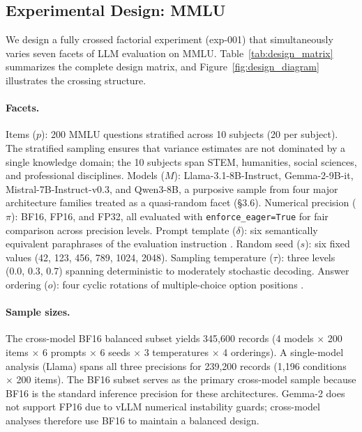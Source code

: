 \subsection{Experimental Design: MMLU}
\label{sec:exp001}

We design a fully crossed factorial experiment (exp-001) that simultaneously varies seven facets of LLM evaluation on MMLU. Table~\ref{tab:design_matrix} summarizes the complete design matrix, and Figure~\ref{fig:design_diagram} illustrates the crossing structure.

\paragraph{Facets.} Items ($p$): 200 MMLU questions stratified across 10 subjects (20 per subject). The stratified sampling ensures that variance estimates are not dominated by a single knowledge domain; the 10 subjects span STEM, humanities, social sciences, and professional disciplines. Models ($M$): Llama-3.1-8B-Instruct, Gemma-2-9B-it, Mistral-7B-Instruct-v0.3, and Qwen3-8B, a purposive sample from four major architecture families treated as a quasi-random facet (\S3.6). Numerical precision ($\pi$): BF16, FP16, and FP32, all evaluated with \texttt{enforce\_eager=True} for fair comparison across precision levels. Prompt template ($\delta$): six semantically equivalent paraphrases of the evaluation instruction \cite{sclar2024formatting}. Random seed ($s$): six fixed values (42, 123, 456, 789, 1024, 2048). Sampling temperature ($\tau$): three levels (0.0, 0.3, 0.7) spanning deterministic to moderately stochastic decoding. Answer ordering ($o$): four cyclic rotations of multiple-choice option positions \cite{pezeshkpour2024ordering}.

\paragraph{Sample sizes.} The cross-model BF16 balanced subset yields 345,600 records (4 models $\times$ 200 items $\times$ 6 prompts $\times$ 6 seeds $\times$ 3 temperatures $\times$ 4 orderings). A single-model analysis (Llama) spans all three precisions for 239,200 records (1,196 conditions $\times$ 200 items). The BF16 subset serves as the primary cross-model sample because BF16 is the standard inference precision for these architectures. Gemma-2 does not support FP16 due to vLLM numerical instability guards; cross-model analyses therefore use BF16 to maintain a balanced design.

